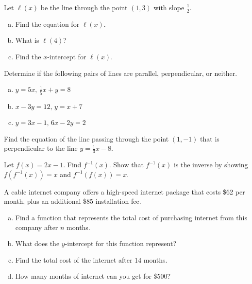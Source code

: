 \documentclass[11pt,letterpaper]{article}
\begin{document}
\newpage





 Let $\ell(x)$ be the line through the point $(1, 3)$ with slope $\frac{1}{2}$.
	\begin{enumerate}[(a)]
	\item Find the equation for $\ell(x)$. 
	\item What is $\ell(4)$?
	\item Find the $x$-intercept for $\ell(x)$. 
	\end{enumerate}





\newpage





 Determine if the following pairs of lines are parallel, perpendicular, or neither.
	\begin{enumerate}[(a)]
	\item $y= 5x$, \enskip $\frac{1}{5}x + y= 8$
	\item $x - 3y= 12$, \enskip $y= x + 7$
	\item $y= 3x - 1$, \enskip $6x - 2y= 2$
	\end{enumerate}





\newpage





 Find the equation of the line passing through the point $(1, -1)$ that is perpendicular to the line $y= \frac{1}{3} x - 8$. 





\newpage





 Let $f(x)= 2x - 1$. Find $f^{-1}(x)$. Show that $f^{-1}(x)$ is the inverse by showing $f(f^{-1}(x))= x$ and $f^{-1}(f(x))= x$. 





\newpage





 A cable internet company offers a high-speed internet package that costs \$62 per month, plus an additional \$85 installation fee. 
	\begin{enumerate}[(a)]
	\item Find a function that represents the total cost of purchasing internet from this company after $n$ months. 
	\item What does the $y$-intercept for this function represent?
	\item Find the total cost of the internet after 14 months.
	\item How many months of internet can you get for \$500?
	\end{enumerate}





\end{document}
